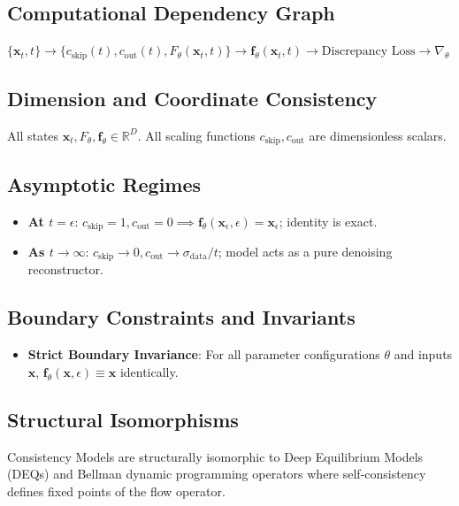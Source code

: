 \documentclass[11pt,a4paper]{article}
\theoremstyle{definition}
\begin{document}
\subsection{Computational Dependency Graph}
{\centering
$\{\mathbf{x}_t, t\} \longrightarrow \{c_{\text{skip}}(t), c_{\text{out}}(t), F_\theta(\mathbf{x}_t, t)\} \longrightarrow \mathbf{f}_\theta(\mathbf{x}_t, t) \longrightarrow \text{Discrepancy Loss} \longrightarrow \nabla_\theta$
\par}

\subsection{Dimension and Coordinate Consistency}
All states $\mathbf{x}_t, F_\theta, \mathbf{f}_\theta \in \mathbb{R}^D$. All scaling functions $c_{\text{skip}}, c_{\text{out}}$ are dimensionless scalars.

\subsection{Asymptotic Regimes}
\begin{itemize}
    \item \textbf{At $t = \epsilon$}: $c_{\text{skip}} = 1, c_{\text{out}} = 0 \implies \mathbf{f}_\theta(\mathbf{x}_\epsilon, \epsilon) = \mathbf{x}_\epsilon$; identity is exact.
    \item \textbf{As $t \to \infty$}: $c_{\text{skip}} \to 0, c_{\text{out}} \to \sigma_{\text{data}}/t$; model acts as a pure denoising reconstructor.
\end{itemize}

\subsection{Boundary Constraints and Invariants}
\begin{itemize}
    \item \textbf{Strict Boundary Invariance}: For all parameter configurations $\theta$ and inputs $\mathbf{x}$, $\mathbf{f}_\theta(\mathbf{x}, \epsilon) \equiv \mathbf{x}$ identically.
\end{itemize}

\subsection{Structural Isomorphisms}
Consistency Models are structurally isomorphic to Deep Equilibrium Models (DEQs) and Bellman dynamic programming operators where self-consistency defines fixed points of the flow operator.
\end{document}
